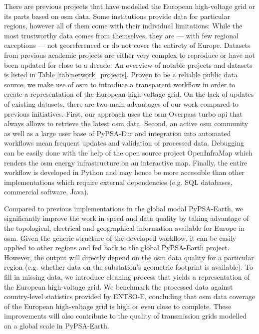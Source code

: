 \documentclass[fleqn,10pt]{wlscirep}
\let\autocite\cite
\begin{document}
There are previous projects that have modelled the European high-voltage grid or its parts based on \gls{osm} data. Some institutions provide data for particular regions, however all of them come with their individual limitations: While the most trustworthy data comes from  themselves, they are --- with few regional exceptions \autocite{50hertzStaticGridModel2022} --- not georeferenced \autocite{jaoStaticGridModel2023} or do not cover the entirety of Europe. Datasets from previous academic projects \autocite{egererElectricitySectorData2014,hutcheonUpdatedValidatedPower2013,medjroubiOpenDataPower2017} are either very complex to reproduce or have not been updated for close to a decade. An overview of notable projects and datasets is listed in Table \ref{tab:network_projects}. Proven to be a reliable public data source, we make use of \acrshort{osm} to introduce a transparent workflow in order to create a representation of the European high-voltage grid. On the lack of updates of existing datasets, there are two main advantages of our work compared to previous initiatives. First, our approach uses the \acrshort{osm} Overpass turbo \gls{api}\autocite{raiferOverpassTurbo2024} that always allows to retrieve the latest \acrshort{osm} data. Second, an active \acrshort{osm} community as well as a large user base of PyPSA-Eur and integration into automated workflows mean frequent updates and validation of processed data. Debugging can be easily done with the help of the open source project OpenInfraMap \autocite{garrettOpenInfrastructureMap2024} which renders the \gls{osm} energy infrastructure on an interactive map. Finally, the entire workflow is developed in Python and may hence be more accessible than other implementations which require external dependencies (e.g. SQL databases, commercial software, Java).\autocite{wiegmansGridKitExtractENTSOE2016}

Compared to previous implementations in the global modal PyPSA-Earth,\autocite{parzenPyPSAEarthNewGlobal2023} we significantly improve the work in speed and data quality by taking advantage of the topological, electrical and geographical information available for Europe in \gls{osm}. Given the generic structure of the developed workflow, it can be easily applied to other regions and fed back to the global PyPSA-Earth project. However, the output will directly depend on the \acrshort{osm} data quality for a particular region (e.g. whether data on the substation's geometric footprint is available). To fill in missing data, we introduce cleaning process that yields a representation of the European high-voltage grid. 
We benchmark the processed data against country-level statistics provided by ENTSO-E, concluding that \acrshort{osm} data coverage of the European high-voltage grid is high or even close to complete. These improvements will also contribute to the quality of transmission grids modelled on a global scale in PyPSA-Earth. 
\end{document}

